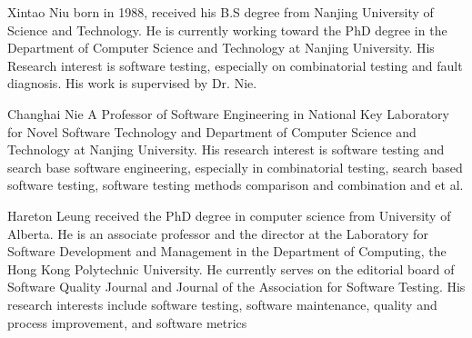 \documentclass[journal,12pt,onecolumn,draftclsnofoot,]{IEEEtran}
\begin{document}
\begin{IEEEbiography}{Xintao Niu}
born in 1988, received his B.S degree from Nanjing University of Science and Technology. He is currently
working toward the PhD degree in the Department of Computer Science and Technology at
Nanjing University. His Research interest is software testing, especially on combinatorial testing and fault diagnosis. His work is supervised by Dr. Nie.
\end{IEEEbiography}

\begin{IEEEbiography}{Changhai Nie}
A Professor of Software Engineering in National Key Laboratory for Novel Software Technology and Department of Computer Science and Technology at Nanjing University. His research interest is software testing and search base software engineering, especially in combinatorial testing, search based software testing, software testing methods comparison and combination and et al.
\end{IEEEbiography}

\begin{IEEEbiography}{Hareton Leung}
received the PhD degree in computer science from University of Alberta. He is an associate professor and the director at the Laboratory for Software Development and Management in the Department of Computing, the Hong Kong Polytechnic University. He currently serves on the editorial board of Software Quality Journal and Journal of the Association for Software Testing. His research interests include software testing, software maintenance, quality and process improvement, and software metrics
\end{IEEEbiography}
\end{document}
